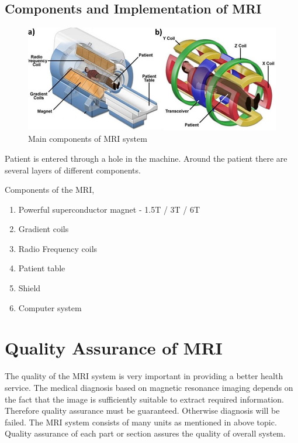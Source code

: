 \documentclass[12pt]{article}
\def \topic{MRI}
\begin{document}
\subsection{Components and Implementation of \topic}
\begin{figure}[h!]
    \centering
    \includegraphics[width=\linewidth]{sys.png}
    \caption{\small{Main components of MRI system}}
    \label{fig:Main components of MRI system}
\end{figure}

Patient is entered through a hole in the machine. Around the patient there are several layers of different components. 

Components of the \topic ,
\begin{enumerate}
    \item Powerful superconductor magnet - 1.5T / 3T / 6T
    \item Gradient coils
    \item Radio Frequency coils
    \item Patient table
    \item Shield
    \item Computer system
    
\end{enumerate}

\pagebreak
\section{Quality Assurance of \topic}

The quality of the MRI system is very important in providing a better health service. The medical diagnosis based on magnetic resonance imaging depends on the fact that the image is sufficiently suitable to extract required information. Therefore quality assurance must be guaranteed. Otherwise diagnosis will be failed. The MRI system consists of many units as mentioned in above topic. Quality assurance of each part or section assures the quality of overall system. 
\end{document}
